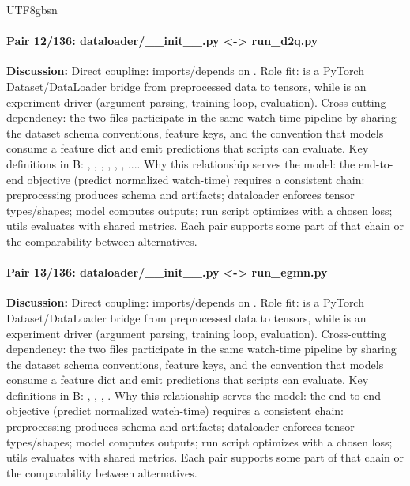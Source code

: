 \documentclass[11pt]{article}
\begin{document}
\begin{CJK*}{UTF8}{gbsn}
\paragraph{Pair 12/136: dataloader/\_\_init\_\_.py <-> run\_d2q.py}
\textbf{Discussion:} Direct coupling: \texttt{} imports/depends on \texttt{}. Role fit: \texttt{} is a PyTorch Dataset/DataLoader bridge from preprocessed data to tensors, while \texttt{} is an experiment driver (argument parsing, training loop, evaluation). Cross-cutting dependency: the two files participate in the same watch-time pipeline by sharing the dataset schema conventions, feature keys, and the convention that models consume a feature dict and emit predictions that scripts can evaluate. Key definitions in B: \texttt{}, \texttt{}, \texttt{}, \texttt{}, \texttt{}, \texttt{}, .... Why this relationship serves the model: the end-to-end objective (predict normalized watch-time) requires a consistent chain: preprocessing produces schema and artifacts; dataloader enforces tensor types/shapes; model computes outputs; run script optimizes with a chosen loss; utils evaluates with shared metrics. Each pair supports some part of that chain or the comparability between alternatives.

\paragraph{Pair 13/136: dataloader/\_\_init\_\_.py <-> run\_egmn.py}
\textbf{Discussion:} Direct coupling: \texttt{} imports/depends on \texttt{}. Role fit: \texttt{} is a PyTorch Dataset/DataLoader bridge from preprocessed data to tensors, while \texttt{} is an experiment driver (argument parsing, training loop, evaluation). Cross-cutting dependency: the two files participate in the same watch-time pipeline by sharing the dataset schema conventions, feature keys, and the convention that models consume a feature dict and emit predictions that scripts can evaluate. Key definitions in B: \texttt{}, \texttt{}, \texttt{}, \texttt{}. Why this relationship serves the model: the end-to-end objective (predict normalized watch-time) requires a consistent chain: preprocessing produces schema and artifacts; dataloader enforces tensor types/shapes; model computes outputs; run script optimizes with a chosen loss; utils evaluates with shared metrics. Each pair supports some part of that chain or the comparability between alternatives.


\end{CJK*}
\end{document}
